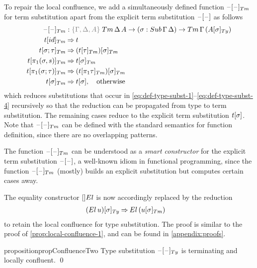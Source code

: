 \documentclass[a4paper,UKenglish,numberwithinsect,cleveref,thm-restate]{lipics-v2021}
\newcommand{\danger}{\marginpar[\hfill\dbend]{\dbend\hfill}}
\begin{document}
To repair the local confluence, we add a simultaneously defined function $\subTm{\blank}{\blank}$ for term substitution apart from the explicit term substitution ${{\mathord{\hspace{1pt}\text{--}\hspace{1pt}}}[ \mathord{\hspace{1pt}\text{--}\hspace{1pt}} ]}$ as follows
\begin{alignat*}{3}
  \subTm{\blank}{\blank} & : \implicit{\Gamma, \Delta, A}\;\Tm\,\Delta\,A \to (\sigma : \Sub\,\Gamma\,\Delta) \to \Tm\,\Gamma\,(\subTy{A}{\sigma}) \\
\subTm{t}{\idS}          & \reduce t \\
\subTm{t}{\sigma ; \tau} & \reduce \subTm{(\subTm{t}{\tau})}{\sigma} \\
\subTm{t}{\pi_1(\sigma, s)} & \reduce \subTm{t}{\sigma} \\
\subTm{t}{\pi_1(\sigma; \tau)} & \reduce \subTm{(\subTm{t}{\pi_1\tau})}{\sigma} \\
\subTm{t}{\sigma}        & \reduce \sub{t}{\sigma}, \quad \text{otherwise}
\end{alignat*}
which reduces substitutions that occur in \eqref{eq:def-type-subst-1}--\eqref{eq:def-type-subst-4} recursively so that the reduction can be propagated from type to term substitution.
The remaining cases reduce to the explicit term substitution ${{t}[ \sigma ]}$.
Note that $\subTm{\blank}{\blank}$ can be defined with the standard semantics for function definition, since there are no overlapping patterns.
\begin{remark}
  The function $\subTm{\blank}{\blank}$ can be understood as a \emph{smart constructor} for the explicit term substitution ${{\mathord{\hspace{1pt}\text{--}\hspace{1pt}}}[ \mathord{\hspace{1pt}\text{--}\hspace{1pt}} ]}$, a well-known idiom in functional programming, since the function $\subTm{\blank}{\blank}$ (mostly) builds an explicit substitution but computes certain cases away.
\end{remark}

The equality constructor $[]\El$ is now accordingly replaced by the reduction
\begin{align}
  \subTy{(\El\, u)}{\sigma} & \reduce \El\,(\subTm{u}{\sigma}) \label{eq:def-type-subst-7}
\end{align}
to retain the local confluence for type substitution. The proof is similar to the proof of \cref{prop:local-confluence-1}, and can be found in \cref{appendix:proofs}.
\begin{restatable}{proposition}{propConfluenceTwo}\label{prop:local-confluence-2}
  Type substitution $\subTy{\blank}{\blank}$ is terminating and locally confluent.
  \qed
  \danger
\end{restatable}
\end{document}
